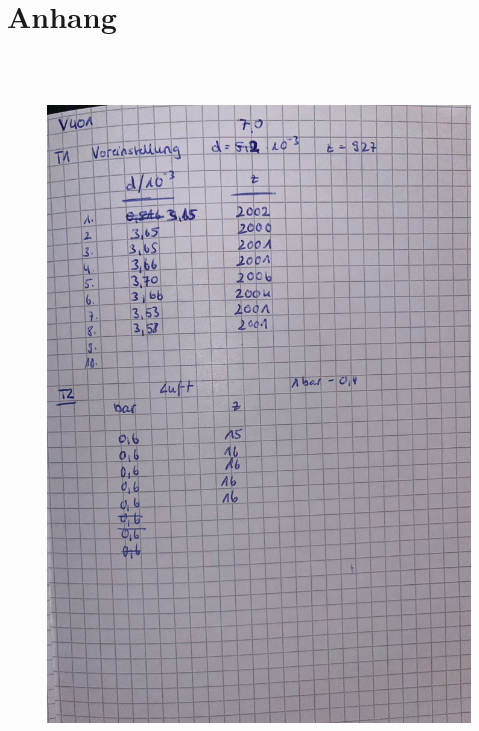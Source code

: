 \section{Anhang}

\begin{figure}[H]
    \centering
    \includegraphics[height=190mm]{bilder/1.jpeg}
\end{figure}
